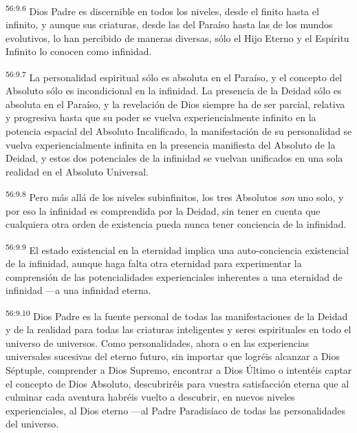 \par
\textsuperscript{56:9.6} Dios Padre es discernible en todos los niveles, desde el finito hasta el infinito, y aunque sus criaturas, desde las del Paraíso hasta las de los mundos evolutivos, lo han percibido de maneras diversas, sólo el Hijo Eterno y el Espíritu Infinito lo conocen como infinidad.

\par
\textsuperscript{56:9.7} La personalidad espiritual sólo es absoluta en el Paraíso, y el concepto del Absoluto sólo es incondicional en la infinidad. La presencia de la Deidad sólo es absoluta en el Paraíso, y la revelación de Dios siempre ha de ser parcial, relativa y progresiva hasta que su poder se vuelva experiencialmente infinito en la potencia espacial del Absoluto Incalificado, la manifestación de su personalidad se vuelva experiencialmente infinita en la presencia manifiesta del Absoluto de la Deidad, y estos dos potenciales de la infinidad se vuelvan unificados en una sola realidad en el Absoluto Universal.

\par
\textsuperscript{56:9.8} Pero más allá de los niveles subinfinitos, los tres Absolutos \textit{son} uno solo, y por eso la infinidad es comprendida por la Deidad, sin tener en cuenta que cualquiera otra orden de existencia pueda nunca tener conciencia de la infinidad.

\par
\textsuperscript{56:9.9} El estado existencial en la eternidad implica una auto-conciencia existencial de la infinidad, aunque haga falta otra eternidad para experimentar la comprensión de las potencialidades experienciales inherentes a una eternidad de infinidad ---a una infinidad eterna.

\par
\textsuperscript{56:9.10} Dios Padre es la fuente personal de todas las manifestaciones de la Deidad y de la realidad para todas las criaturas inteligentes y seres espirituales en todo el universo de universos. Como personalidades, ahora o en las experiencias universales sucesivas del eterno futuro, sin importar que logréis alcanzar a Dios Séptuple, comprender a Dios Supremo, encontrar a Dios Último o intentéis captar el concepto de Dios Absoluto, descubriréis para vuestra satisfacción eterna que al culminar cada aventura habréis vuelto a descubrir, en nuevos niveles experienciales, al Dios eterno ---al Padre Paradisíaco de todas las personalidades del universo.

